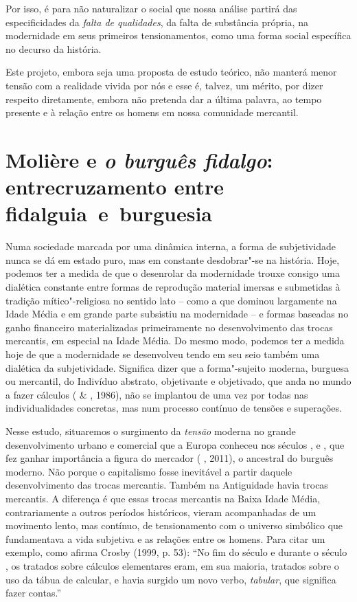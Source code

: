 Por isso, é para não naturalizar o social que nossa análise partirá das
especificidades da \emph{falta de qualidades}, da falta de substância
própria, na modernidade em seus primeiros tensionamentos, como uma forma
social específica no decurso da história.

Este projeto, embora seja uma proposta de estudo teórico, não manterá
menor tensão com a realidade vivida por nós e esse é, talvez, um mérito,
por dizer respeito diretamente, embora não pretenda dar a última
palavra, ao tempo presente e à relação entre os homens em nossa
comunidade mercantil.

\chapter*{Molière e \emph{o burguês fidalgo}: entrecruzamento entre fidalguia~e~burguesia}

Numa sociedade marcada por uma dinâmica interna, a forma de
subjetividade nunca se dá em estado puro, mas em constante desdobrar"-se
na história. Hoje, podemos ter a medida de que o desenrolar da
modernidade trouxe consigo uma dialética constante entre formas de
reprodução material imersas e submetidas à tradição mítico"-religiosa no
sentido lato -- como a que dominou largamente na Idade Média e em grande
parte subsistiu na modernidade -- e formas baseadas no ganho financeiro
materializadas primeiramente no desenvolvimento das trocas mercantis, em
especial na Idade Média. Do mesmo modo, podemos ter a medida hoje de que
a modernidade se desenvolveu tendo em seu seio também uma dialética da
subjetividade. Significa dizer que a forma"-sujeito moderna, burguesa ou
mercantil, do Indivíduo abstrato, objetivante e objetivado, que anda no
mundo a fazer cálculos ( \& , 1986), não se implantou de
uma vez por todas nas individualidades concretas, mas num processo
contínuo de tensões e superações.

Nesse estudo, situaremos o surgimento da \emph{tensão} moderna no grande
desenvolvimento urbano e comercial que a Europa conheceu nos séculos ,
 e , que fez ganhar importância a figura do mercador ( ,
2011), o ancestral do burguês moderno. Não porque o capitalismo fosse
inevitável a partir daquele desenvolvimento das trocas mercantis. Também
na Antiguidade havia trocas mercantis. A diferença é que essas trocas
mercantis na Baixa Idade Média, contrariamente a outros períodos
históricos, vieram acompanhadas de um movimento lento, mas contínuo, de
tensionamento com o universo simbólico que fundamentava a vida subjetiva
e as relações entre os homens. Para citar um exemplo, como afirma Crosby
(1999, p. 53): ``No fim do século  e durante o século , os tratados
sobre cálculos elementares eram, em sua maioria, tratados sobre o uso da
tábua de calcular, e havia surgido um novo verbo, \emph{tabular}, que
significa fazer contas.''

